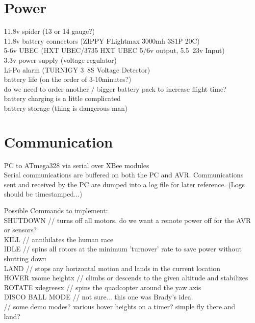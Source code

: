 \documentclass{article}
\begin{document}
\section{Power}
11.8v spider (13 or 14 gauge?)\\
11.8v battery connectors (ZIPPY FLightmax 3000mh 3S1P 20C)\\
5-6v UBEC (HXT UBEC/3735 HXT UBEC 5/6v output, 5.5~23v Input) \\
3.3v power supply (voltage regulator)\\
Li-Po alarm (TURNIGY 3~8S Voltage Detector)\\
battery life (on the order of 3-10minutes?)\\
do we need to order another / bigger battery pack to increase flight time?\\
battery charging is a little complicated\\
battery storage (thing is dangerous man)\\

\section{Communication}
PC to ATmega328 via serial over XBee modules\\

Serial communications are buffered on both the PC and AVR.  Communications sent and received by the PC are dumped into a log file for later reference.  (Logs should be timestamped...)

Possible Commands to implement:\\

SHUTDOWN // turns off all motors.  do we want a remote power off for the AVR or sensors?\\
KILL // annihilates the human race\\
IDLE // spins all rotors at the minimum 'turnover' rate to save power without shutting down\\
LAND // stops any horizontal motion and lands in the current location\\
HOVER xsome heightx  // climbs or descends to the given altitude and stabilizes\\
ROTATE xdegreesx    // spins the quadcopter around the yaw axis\\
DISCO BALL MODE      // not sure... this one was Brady's idea.\\
// some demo modes? various hover heights on a timer?  simple fly there and land?\\
\end{document}
